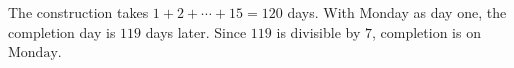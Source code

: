 The construction takes $1+2+\cdots+15=120$ days. With Monday as day one, the completion day is $119$ days later. Since $119$ is divisible by $7$, completion is on $\boxed{\text{Monday}}$.
